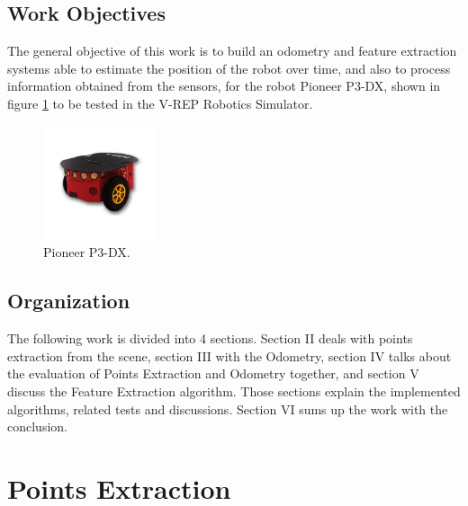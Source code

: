 \documentclass[twoside,conference,a4paper]{IEEEtran}
\begin{document}
\subsection{Work Objectives}

The general objective of this work is to build an odometry and feature extraction systems able to estimate the position of the robot over time, and also to process information obtained from the sensors, for the robot Pioneer P3-DX, shown in figure \ref{fig:p3-dx} to be tested in the V-REP \cite{robotics2016v} Robotics Simulator.

\begin{figure}[ht]
    \centering
    \includegraphics[width=0.3\textwidth]{figures/robot-mobile-pioneer-3-dx.jpg}
    \caption{Pioneer P3-DX.}
    \label{fig:p3-dx}
\end{figure}

\subsection{Organization}
The following work is divided into 4 sections. Section II deals with points extraction from the scene, section III with the Odometry, section IV talks about the evaluation of Points Extraction and Odometry together, and section V discuss the Feature Extraction algorithm. Those sections explain the implemented algorithms, related tests and discussions. Section VI sums up the work with the conclusion. 
\section{Points Extraction}
\end{document}
